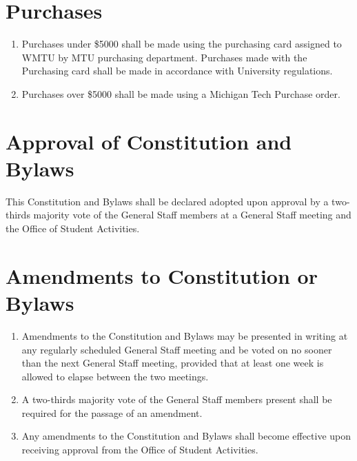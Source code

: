 \documentclass[12pt]{constitution}
\begin{document}
\section{​Purchases}
\begin{enumerate}
\item Purchases under \$5000 shall be made using the purchasing card assigned to WMTU by MTU purchasing department. Purchases made with the Purchasing card shall be made in accordance with University regulations.
\item Purchases over \$5000 shall be made using a Michigan Tech Purchase order.
\end{enumerate}




\section{​Approval of Constitution and Bylaws}
This Constitution and Bylaws shall be declared adopted upon approval by a two-thirds majority vote of the General Staff members at a General Staff meeting and the Office of Student Activities.


\section{​Amendments to Constitution or Bylaws}
\begin{enumerate}
\item Amendments to the Constitution and Bylaws may be presented in writing at any regularly scheduled General Staff meeting and be voted on no sooner than the next General Staff meeting, provided that at least one week is allowed to elapse between the two meetings.
\item A two-­thirds majority vote of the General Staff members present shall be required for the passage of an amendment.
\item Any amendments to the Constitution and Bylaws shall become effective upon receiving approval from the Office of Student Activities.
\end{enumerate}
\end{document}
